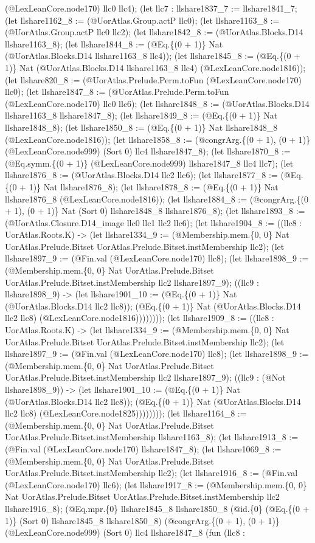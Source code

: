 \documentclass[11pt]{article}
\begin{document}
(@LexLeanCore.node170) llc0 llc4); (let llc7 : llshare1837\_7 := llshare1841\_7; (let llshare1162\_8 := (@UorAtlas.Group.actP llc0); (let llshare1163\_8 := (@UorAtlas.Group.actP llc0 llc2); (let llshare1842\_8 := (@UorAtlas.Blocks.D14 llshare1163\_8); (let llshare1844\_8 := (@Eq.\{(0 + 1)\} Nat (@UorAtlas.Blocks.D14 llshare1163\_8 llc4)); (let llshare1845\_8 := (@Eq.\{(0 + 1)\} Nat (@UorAtlas.Blocks.D14 llshare1163\_8 llc4) (@LexLeanCore.node1816)); (let llshare820\_8 := (@UorAtlas.Prelude.Perm.toFun (@LexLeanCore.node170) llc0); (let llshare1847\_8 := (@UorAtlas.Prelude.Perm.toFun (@LexLeanCore.node170) llc0 llc6); (let llshare1848\_8 := (@UorAtlas.Blocks.D14 llshare1163\_8 llshare1847\_8); (let llshare1849\_8 := (@Eq.\{(0 + 1)\} Nat llshare1848\_8); (let llshare1850\_8 := (@Eq.\{(0 + 1)\} Nat llshare1848\_8 (@LexLeanCore.node1816)); (let llshare1858\_8 := (@congrArg.\{(0 + 1), (0 + 1)\} (@LexLeanCore.node999) (Sort 0) llc4 llshare1847\_8); (let llshare1870\_8 := (@Eq.symm.\{(0 + 1)\} (@LexLeanCore.node999) llshare1847\_8 llc4 llc7); (let llshare1876\_8 := (@UorAtlas.Blocks.D14 llc2 llc6); (let llshare1877\_8 := (@Eq.\{(0 + 1)\} Nat llshare1876\_8); (let llshare1878\_8 := (@Eq.\{(0 + 1)\} Nat llshare1876\_8 (@LexLeanCore.node1816)); (let llshare1884\_8 := (@congrArg.\{(0 + 1), (0 + 1)\} Nat (Sort 0) llshare1848\_8 llshare1876\_8); (let llshare1893\_8 := (@UorAtlas.Closure.D14\_image llc0 llc1 llc2 llc6); (let llshare1904\_8 := ((llc8 : UorAtlas.Roots.K) -> (let llshare1334\_9 := (@Membership.mem.\{0, 0\} Nat UorAtlas.Prelude.Bitset UorAtlas.Prelude.Bitset.instMembership llc2); (let llshare1897\_9 := (@Fin.val (@LexLeanCore.node170) llc8); (let llshare1898\_9 := (@Membership.mem.\{0, 0\} Nat UorAtlas.Prelude.Bitset UorAtlas.Prelude.Bitset.instMembership llc2 llshare1897\_9); ((llc9 : llshare1898\_9) -> (let llshare1901\_10 := (@Eq.\{(0 + 1)\} Nat (@UorAtlas.Blocks.D14 llc2 llc8)); (@Eq.\{(0 + 1)\} Nat (@UorAtlas.Blocks.D14 llc2 llc8) (@LexLeanCore.node1816)))))))); (let llshare1909\_8 := ((llc8 : UorAtlas.Roots.K) -> (let llshare1334\_9 := (@Membership.mem.\{0, 0\} Nat UorAtlas.Prelude.Bitset UorAtlas.Prelude.Bitset.instMembership llc2); (let llshare1897\_9 := (@Fin.val (@LexLeanCore.node170) llc8); (let llshare1898\_9 := (@Membership.mem.\{0, 0\} Nat UorAtlas.Prelude.Bitset UorAtlas.Prelude.Bitset.instMembership llc2 llshare1897\_9); ((llc9 : (@Not llshare1898\_9)) -> (let llshare1901\_10 := (@Eq.\{(0 + 1)\} Nat (@UorAtlas.Blocks.D14 llc2 llc8)); (@Eq.\{(0 + 1)\} Nat (@UorAtlas.Blocks.D14 llc2 llc8) (@LexLeanCore.node1825)))))))); (let llshare1164\_8 := (@Membership.mem.\{0, 0\} Nat UorAtlas.Prelude.Bitset UorAtlas.Prelude.Bitset.instMembership llshare1163\_8); (let llshare1913\_8 := (@Fin.val (@LexLeanCore.node170) llshare1847\_8); (let llshare1069\_8 := (@Membership.mem.\{0, 0\} Nat UorAtlas.Prelude.Bitset UorAtlas.Prelude.Bitset.instMembership llc2); (let llshare1916\_8 := (@Fin.val (@LexLeanCore.node170) llc6); (let llshare1917\_8 := (@Membership.mem.\{0, 0\} Nat UorAtlas.Prelude.Bitset UorAtlas.Prelude.Bitset.instMembership llc2 llshare1916\_8); (@Eq.mpr.\{0\} llshare1845\_8 llshare1850\_8 (@id.\{0\} (@Eq.\{(0 + 1)\} (Sort 0) llshare1845\_8 llshare1850\_8) (@congrArg.\{(0 + 1), (0 + 1)\} (@LexLeanCore.node999) (Sort 0) llc4 llshare1847\_8 (fun (llc8 : 
\end{document}
